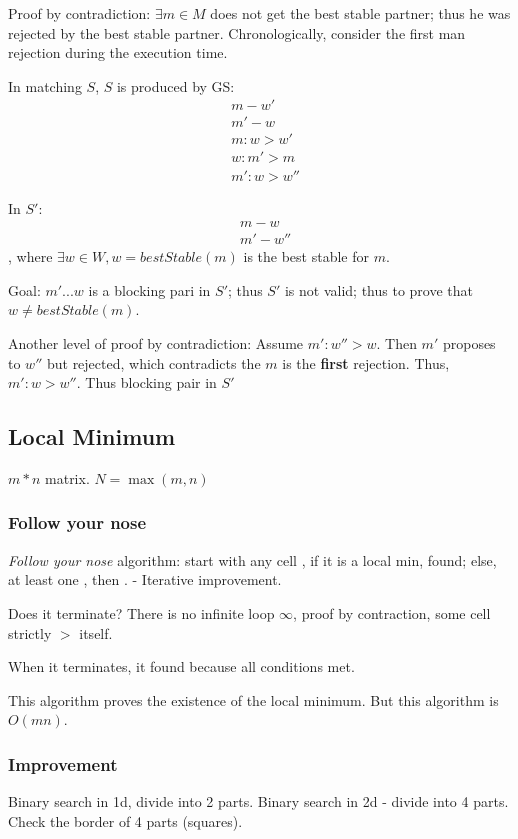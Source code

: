 \documentclass[a4paper]{report}
\begin{document}
Proof by contradiction: $\exists m\in M$ does not get the best stable partner; thus he was rejected by the best stable partner. Chronologically, consider the first man rejection during the execution time. 

In matching $S$, $S$ is produced by GS:
\begin{align*}
& m-w'\\
& m'-w\\
& m: w >w'\\
& w: m' > m\\
&m': w > w''
\end{align*}

In $S'$: 
\begin{align*}
& m-w\\
& m'-w''
\end{align*}
, where $\exists w\in W, w=bestStable(m)$ is the best stable for $m$. 



Goal: $m'... w$ is a blocking pari in $S'$; thus $S'$ is not valid; thus to prove that $w\neq bestStable(m)$. 

Another level of proof by contradiction: 
Assume $m': w'' >w$. Then $m'$ proposes to $w''$ but rejected, which contradicts the $m$ is the \textbf{first} rejection. Thus, $m': w>w''$. Thus blocking pair in $S'$

\subsection*{Local Minimum}
$m*n$ matrix. $N=\max(m, n)$

\subsubsection*{Follow your nose} 
\textit{Follow your nose} algorithm: start with any cell , if it is a local min, found; else, at least one , then . - Iterative improvement. 

Does it terminate? There is no infinite loop $\infty$, proof by contraction, some cell strictly $>$ itself.

When it terminates, it found because all conditions met. 

This algorithm proves the existence of the local minimum. But this algorithm is $O(mn)$.
\subsubsection*{Improvement}
Binary search in 1d, divide into 2 parts. Binary search in 2d - divide into 4 parts. 
Check the border of 4 parts (squares). 
\end{document}
